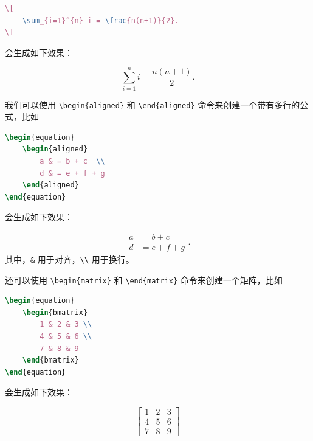 \begin{lstlisting}[language=TeX]
\[ 
    \sum_{i=1}^{n} i = \frac{n(n+1)}{2}.
\]
\end{lstlisting}

\noindent 会生成如下效果：

\[ 
    \sum_{i=1}^{n} i = \frac{n(n+1)}{2}.
\]

我们可以使用 \texttt{\textbackslash begin\{aligned\}} 和 \texttt{\textbackslash end\{aligned\}} 命令来创建一个带有多行的公式，比如

\begin{lstlisting}[language=TeX]
\begin{equation}
    \begin{aligned}
        a & = b + c  \\ 
        d & = e + f + g
    \end{aligned}
\end{equation}
\end{lstlisting}

\noindent 会生成如下效果：

\begin{equation}
    \begin{aligned}
        a & = b + c      \\ 
        d & = e + f + g
    \end{aligned}.
\end{equation}
其中，\texttt{\&} 用于对齐，\texttt{\textbackslash\textbackslash} 用于换行。

还可以使用 \texttt{\textbackslash begin\{matrix\}} 和 \texttt{\textbackslash end\{matrix\}} 命令来创建一个矩阵，比如

\begin{lstlisting}[language=TeX]
\begin{equation}
    \begin{bmatrix}
        1 & 2 & 3 \\
        4 & 5 & 6 \\
        7 & 8 & 9
    \end{bmatrix}
\end{equation}
\end{lstlisting}

\noindent 会生成如下效果：

\begin{equation}
    \begin{bmatrix}
        1 & 2 & 3  \\
        4 & 5 & 6  \\
        7 & 8 & 9
    \end{bmatrix}
\end{equation}

